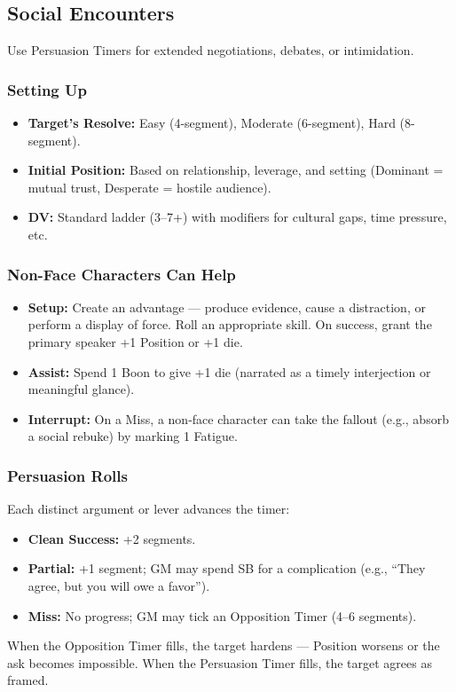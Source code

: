 \subsection{Social Encounters}

Use Persuasion Timers for extended negotiations, debates, or intimidation.

\subsubsection{Setting Up}
\begin{itemize}
  \item \textbf{Target's Resolve:} Easy (4-segment), Moderate (6-segment), Hard (8-segment).
  \item \textbf{Initial Position:} Based on relationship, leverage, and setting (Dominant = mutual trust, Desperate = hostile audience).
  \item \textbf{DV:} Standard ladder (3--7+) with modifiers for cultural gaps, time pressure, etc.
\end{itemize}

\subsubsection{Non-Face Characters Can Help}
\begin{itemize}
  \item \textbf{Setup:} Create an advantage --- produce evidence, cause a distraction, or perform a display of force. Roll an appropriate skill. On success, grant the primary speaker +1 Position or +1 die.
  \item \textbf{Assist:} Spend 1 Boon to give +1 die (narrated as a timely interjection or meaningful glance).
  \item \textbf{Interrupt:} On a Miss, a non-face character can take the fallout (e.g., absorb a social rebuke) by marking 1 Fatigue.
\end{itemize}

\subsubsection{Persuasion Rolls}
Each distinct argument or lever advances the timer:
\begin{itemize}
  \item \textbf{Clean Success:} +2 segments.
  \item \textbf{Partial:} +1 segment; GM may spend SB for a complication (e.g., ``They agree, but you will owe a favor'').
  \item \textbf{Miss:} No progress; GM may tick an Opposition Timer (4--6 segments).
\end{itemize}
When the Opposition Timer fills, the target hardens --- Position worsens or the ask becomes impossible. When the Persuasion Timer fills, the target agrees as framed.

